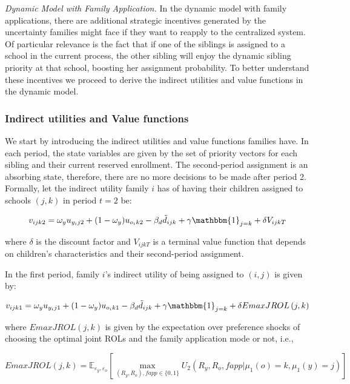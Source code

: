 \documentclass{article}
\begin{document}
\textit{Dynamic Model with Family Application.} In the dynamic model with family applications, there are additional strategic incentives generated by the uncertainty families might face if they want to reapply to the centralized system. Of particular relevance is the fact that if one of the siblings is assigned to a school in the current process, the other sibling will enjoy the dynamic sibling priority at that school, boosting her assignment probability. To better understand these incentives we proceed to derive the indirect utilities and value functions in the dynamic model.

\subsubsection{Indirect utilities and Value functions}

We start by introducing the indirect utilities and value functions families have. In each period, the state variables are given by the set of priority vectors for each sibling and their current reserved enrollment. The second-period assignment is an absorbing state, therefore, there are no more decisions to be made after period 2. Formally, let the indirect utility family $i$ has of having their children assigned to schools $(j,k)$ in period $t=2$ be:


\begin{equation}
    v_{ijk2} = \omega_{y} u_{y_ij2} + (1-\omega_{y})u_{o_ik2} - \beta_d \tilde{d}_{ijk} + \gamma \mathbbm{1}_{j = k} + \delta V_{ijkT}
\end{equation}

where $\delta$ is the discount factor and $V_{ijkT}$ is a terminal value function that depends on children's characteristics and their second-period assignment. 

In the first period, family $i$'s indirect utility of being assigned to $(i,j)$ is given by:

\begin{equation}
    v_{ijk1} = \omega_{y} u_{y_ij1} + (1-\omega_{y})u_{o_ik1} - \beta_d \tilde{d}_{ijk} + \gamma \mathbbm{1}_{j = k} + \delta EmaxJROL\left( j, k \right)
\end{equation}

where $EmaxJROL\left( j, k \right)$ is given by the expectation over preference shocks of choosing the optimal joint ROLs and the family application mode or not, i.e., 

\begin{equation}
    EmaxJROL\left( j, k \right) = \mathbb{E}_{\varepsilon_{y}, \varepsilon_{o}}\left[ \max_{\left( R_y, R_o\right), fapp \in \lbrace 0, 1 \rbrace} U_2\left( R_y, R_o, fapp | \mu_1(o) = k, \mu_1(y) = j\right) \right]
\end{equation}
\end{document}
